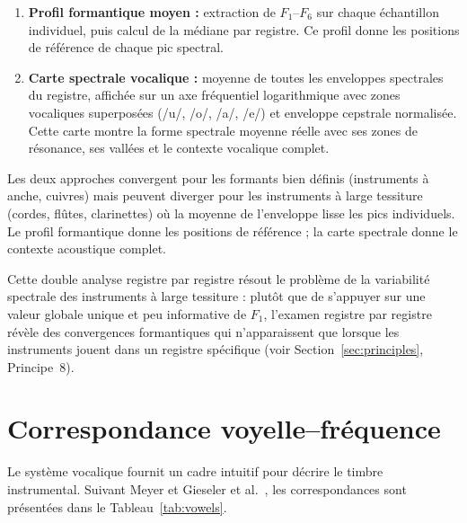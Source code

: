 \documentclass[12pt,a4paper]{article}
\begin{document}
\begin{enumerate}
\item \textbf{Profil formantique moyen :} extraction de $F_1$--$F_6$ sur chaque
échantillon individuel, puis calcul de la médiane par registre. Ce profil donne les
positions de référence de chaque pic spectral.

\item \textbf{Carte spectrale vocalique :} moyenne de toutes les enveloppes spectrales
du registre, affichée sur un axe fréquentiel logarithmique avec zones vocaliques
superposées (/u/, /o/, /a/, /e/) et enveloppe cepstrale normalisée. Cette carte montre
la forme spectrale moyenne réelle avec ses zones de résonance, ses vallées et le
contexte vocalique complet.
\end{enumerate}

Les deux approches convergent pour les formants bien définis (instruments à anche,
cuivres) mais peuvent diverger pour les instruments à large tessiture (cordes, flûtes,
clarinettes) où la moyenne de l'enveloppe lisse les pics individuels. Le profil
formantique donne les positions de référence ; la carte spectrale donne le contexte
acoustique complet.

Cette double analyse registre par registre résout le problème de la variabilité
spectrale des instruments à large tessiture : plutôt que de s'appuyer sur une valeur
globale unique et peu informative de $F_1$, l'examen registre par registre révèle des
convergences formantiques qui n'apparaissent que lorsque les instruments jouent dans
un registre spécifique (voir Section~\ref{sec:principles}, Principe~8).

\section{Correspondance voyelle--fréquence}

Le système vocalique fournit un cadre intuitif pour décrire le timbre instrumental.
Suivant Meyer \citep{Meyer2009} et Gieseler et al.\ \citep{Gieseler1985}, les
correspondances sont présentées dans le Tableau~\ref{tab:vowels}.
\end{document}
